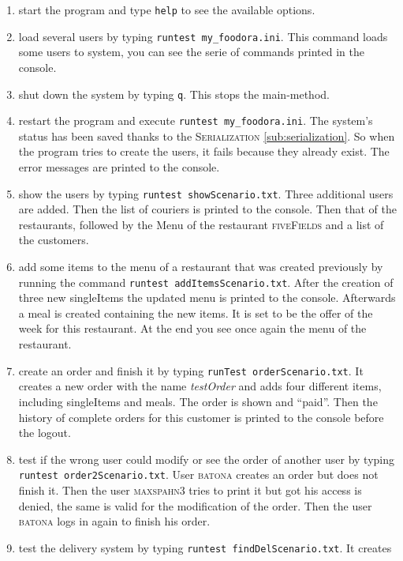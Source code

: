 \begin{enumerate}[itemsep=0mm]
	\item start the program and type \lstinline|help| to see the available options.
	\item load several users by typing \lstinline|runtest my_foodora.ini|. This command loads 
		some users to system, you can see the serie of commands printed in the console.
	\item shut down the system by typing \lstinline|q|. This stops the main-method.
	\item restart the program and execute \lstinline|runtest my_foodora.ini|. The system's 
		status has been saved thanks to the \textsc{Serialization} \ref{sub:serialization}. So when the program tries
		to create the users, it fails because they already exist. The error messages are 
		printed to the console.
	\item show the users by typing \lstinline|runtest showScenario.txt|. Three additional users
		are added. Then the list of couriers is printed to the console. Then that of the 
		restaurants, followed by the Menu of the restaurant \textsc{fiveFields} and a list of
		the customers.
	\item add some items to the menu of a restaurant that was created previously by running the 
		command \lstinline|runtest addItemsScenario.txt|. After the creation of three new 
		singleItems the updated menu is printed to the console. Afterwards a meal is created
		containing the new items. It is set to be the offer of the week for this restaurant.
		At the end you see once again the menu of the restaurant.
	\item create an order and finish it by typing \lstinline|runTest orderScenario.txt|. It 
		creates a new order with the name \textit{testOrder} and adds four different items, 
		including singleItems and meals. The order is shown and ``paid''. Then the history
		of complete orders for this customer is printed to the console before the logout.
	\item test if the wrong user could modify or see the order of another user by typing
		\lstinline|runtest order2Scenario.txt|. User \textsc{batona} creates an order but 
		does not finish it. Then the user \textsc{maxspahn3} tries to print it but got his
		access is denied, the same is valid for the modification of the order. Then the 
		user \textsc{batona} logs in again to finish his order.
	\item test the delivery system by typing \lstinline|runtest findDelScenario.txt|. It creates

\end{enumerate}
